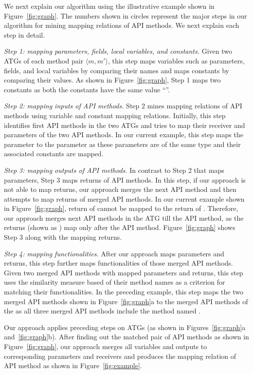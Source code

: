 We next explain our algorithm using the illustrative example shown
in Figure~\ref{fig:graph}. The numbers shown in circles
represent the major steps in our algorithm for mining mapping
relations of API methods. We next explain each step in detail.

\emph{Step 1: mapping parameters, fields, local variables, and constants.}
Given two ATGs of each method pair $\langle m, m' \rangle$, this step maps
variables such as parameters, fields, and local variables by comparing their names
and maps constants by comparing their values. As shown in
Figure~\ref{fig:graph}, Step 1 maps two constants as both the constants
have the same value ``''.

\emph{Step 2: mapping inputs of API methods.} Step 2 mines mapping
relations of API methods using variable and constant mapping relations.
Initially, this step identifies first API methods in the two ATGs and tries to
map their receiver and parameters of the two API methods.
In our current example, this step maps the parameter 
to the parameter  as these parameters
are of the same type and their associated constants are mapped.

\emph{Step 3: mapping outputs of API methods.} In contrast to Step 2
that maps parameters, Step 3 maps returns of API methods. In
this step, if our approach is not able to map returns, our
approach merges the next API method and then attempts to map returns of merged API methods. In our current example shown in
Figure~\ref{fig:graph}, return of
 cannot be mapped to the
return of . Therefore, our
approach merges next API methods in the ATG till the 
API method, as the returns (shown as ) map
only after the  API method. Figure~\ref{fig:graph}
shows Step 3 along with the mapping returns.

\emph{Step 4: mapping functionalities.} After our approach maps
parameters and returns, this step further maps functionalities
of those merged API methods. Given two merged API methods with
mapped parameters and returns, this step uses the similarity
measure based of their method names as a criterion for matching
their functionalities. In the preceding example, this step maps the
two merged API methods shown in Figure~\ref{fig:graph}a to the
merged API methods of the  as all
three merged API methods include the method named .

Our approach applies preceding steps on ATGs (as shown in
Figures~\ref{fig:graph}a and~\ref{fig:graph}b). After finding out
the matched pair of API methods as shown in Figure~\ref{fig:graph},
our approach merges all variables and outputs to corresponding
parameters and receivers and produces the mapping relation of API
method as shown in Figure~\ref{fig:example}.
